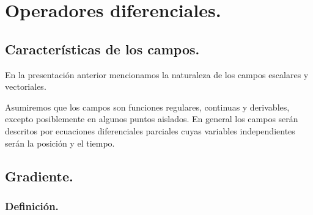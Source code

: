 \newpage
\section{Operadores diferenciales.}

\subsection{Características de los campos.}

En la presentación anterior mencionamos la naturaleza de los campos escalares y vectoriales.
\par
Asumiremos que los campos son funciones regulares, continuas y derivables, excepto posiblemente en algunos puntos aislados. En general los campos serán descritos por ecuaciones diferenciales parciales cuyas variables independientes serán la posición y el tiempo.

\subsection{Gradiente.}

\subsubsection{Definición.}

